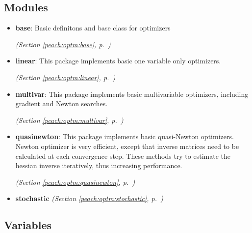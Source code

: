 \subsection{Modules}

\begin{itemize}
\setlength{\parskip}{0ex}
\item \textbf{base}: 
Basic definitons and base class for optimizers


  \textit{(Section \ref{peach:optm:base}, p.~\pageref{peach:optm:base})}

\item \textbf{linear}: 
This package implements basic one variable only optimizers.


  \textit{(Section \ref{peach:optm:linear}, p.~\pageref{peach:optm:linear})}

\item \textbf{multivar}: 
This package implements basic multivariable optimizers, including gradient and
Newton searches.


  \textit{(Section \ref{peach:optm:multivar}, p.~\pageref{peach:optm:multivar})}

\item \textbf{quasinewton}: 
This package implements basic quasi-Newton optimizers. Newton optimizer is very
efficient, except that inverse matrices need to be calculated at each
convergence step. These methods try to estimate the hessian inverse iteratively,
thus increasing performance.


  \textit{(Section \ref{peach:optm:quasinewton}, p.~\pageref{peach:optm:quasinewton})}

\item \textbf{stochastic}
  \textit{(Section \ref{peach:optm:stochastic}, p.~\pageref{peach:optm:stochastic})}

\end{itemize}



  \subsection{Variables}

